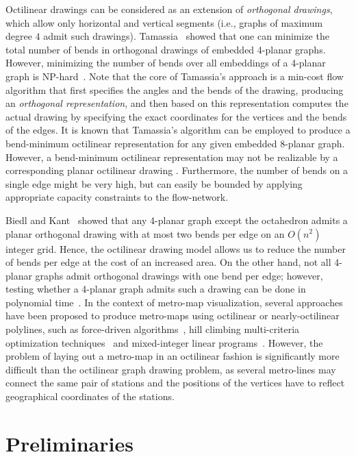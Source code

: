 \documentclass[a4paper,twoside,11pt]{article}
\begin{document}
Octilinear drawings can be considered as an extension of
\emph{orthogonal drawings}, which allow only horizontal and vertical
segments (i.e., graphs of maximum degree $4$ admit such drawings).
Tamassia~\cite{Tamassia87} showed that one can minimize the total
number of bends in orthogonal drawings of embedded 4-planar graphs.
However, minimizing the number of bends over all embeddings of a
4-planar graph is NP-hard~\cite{GT01}. Note that the core of
Tamassia's approach is a min-cost flow algorithm that first
specifies the angles and the bends of the drawing, producing an
\emph{orthogonal representation}, and then based on this
representation computes the actual drawing by specifying the exact
coordinates for the vertices and the bends of the edges. It is known
that Tamassia's algorithm can be employed to produce a bend-minimum
octilinear representation for any given embedded 8-planar graph.
However, a bend-minimum octilinear representation may not be
realizable by a corresponding planar octilinear drawing \cite{BT04}.
Furthermore, the number of bends on a single edge might be very
high, but can easily be bounded by applying appropriate capacity
constraints to the flow-network.

Biedl and Kant~\cite{BK94} showed that any 4-planar graph except the
octahedron admits a planar orthogonal drawing with at most two bends
per edge on an $O(n^2)$ integer grid. Hence, the octilinear drawing
model allows us to reduce the number of bends per edge at the cost
of an increased area. On the other hand, not all 4-planar graphs
admit orthogonal drawings with one bend per edge; however, testing
whether a 4-planar graph admits such a drawing can be done in
polynomial time~\cite{BKRW14}. In the context of metro-map
visualization, several approaches have been proposed to produce
metro-maps using octilinear or nearly-octilinear polylines, such as
force-driven algorithms~\cite{HMN06}, hill climbing multi-criteria
optimization techniques~\cite{SROW11} and mixed-integer linear
programs~\cite{NW11}. However, the problem of laying out a metro-map
in an octilinear fashion is significantly more difficult than the
octilinear graph drawing problem, as several metro-lines may connect
the same pair of stations and the positions of the vertices have to
reflect geographical coordinates of the stations.


\section{Preliminaries}
\label{sec:preliminaries}
\end{document}
